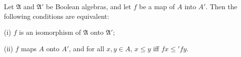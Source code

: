 Let $\mathfrak{A}$ and $\mathfrak{A}'$ be Boolean algebras, and let $f$ be a map of $A$ into $A'$. Then the following conditions are equivalent:

(i) $f$ is an isomorphism of $\mathfrak{A}$ onto $\mathfrak{A}'$;

(ii) $f$ maps $A$ onto $A'$, and for all $x, y \in A$, $x \leq y$ iff $fx \leq' fy$.
